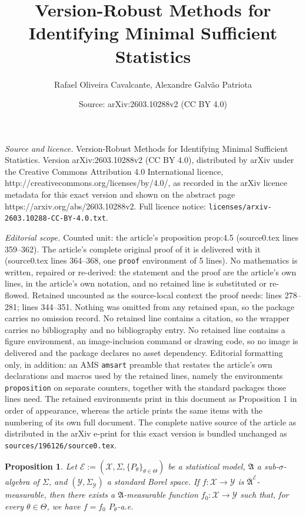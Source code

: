 \documentclass[10pt,a4paper]{amsart}
\title{Version-Robust Methods for Identifying Minimal Sufficient Statistics}
\author{Rafael Oliveira Cavalcante, Alexandre Galv\~ao Patriota}
\date{Source: arXiv:2603.10288v2 (CC BY 4.0)}
\newtheorem{proposition}{Proposition}
\begin{document}
\maketitle

\noindent\emph{Source and licence.} Version-Robust Methods for Identifying Minimal Sufficient Statistics. Version arXiv:2603.10288v2 (CC BY 4.0), distributed by arXiv under the Creative Commons Attribution 4.0 International licence, http://creativecommons.org/licenses/by/4.0/, as recorded in the arXiv licence metadata for this exact version and shown on the abstract page https://arxiv.org/abs/2603.10288v2. Full licence notice: \texttt{licenses/arxiv-2603.10288-CC-BY-4.0.txt}.\par\smallskip

\noindent\textit{Editorial scope.} Counted unit: the article's proposition prop:4.5 (source0.tex lines 359--362). The article's complete original proof of it is delivered with it (source0.tex lines 364--368, one \texttt{proof} environment of 5 lines). No mathematics is written, repaired or re-derived: the statement and the proof are the article's own lines, in the article's own notation, and no retained line is substituted or re-flowed.  Retained uncounted as the source-local context the proof needs: lines 278--281; lines 344--351.  Nothing was omitted from any retained span, so the package carries no omission record.  No retained line contains a citation, so the wrapper carries no bibliography and no bibliography entry.  No retained line contains a figure environment, an image-inclusion command or drawing code, so no image is delivered and the package declares no asset dependency.  Editorial formatting only, in addition: an AMS \texttt{amsart} preamble that restates the article's own declarations and macros used by the retained lines, namely the environments \texttt{proposition} on separate counters, together with the standard packages those lines need.  The retained environments print in this document as Proposition 1 in order of appearance, whereas the article prints the same items with the numbering of its own full document.  The complete native source of the article as distributed in the arXiv e-print for this exact version is bundled unchanged as \texttt{sources/196126/source0.tex}.
\begin{proposition}
\label{prop:4.1}
Let $\mathcal{E}:=(\mathcal{X},\Sigma,\{P_\theta\}_{\theta\in\Theta})$ be a statistical model, $\mathfrak{A}$ a sub-$\sigma$-algebra of $\Sigma$, and $(\mathcal{Y},\Sigma_\mathcal{Y})$ a standard Borel space. If $f:\mathcal{X}\to \mathcal{Y}$ is $\overline{\mathfrak{A}}^\mathcal{E}$-measurable, then there exists a $\mathfrak{A}$-measurable function $f_0:\mathcal{X}\to\mathcal{Y}$ such that, for every $\theta\in\Theta$, we have $f=f_0$ $P_\theta$-a.e.
\end{proposition}
\end{document}
